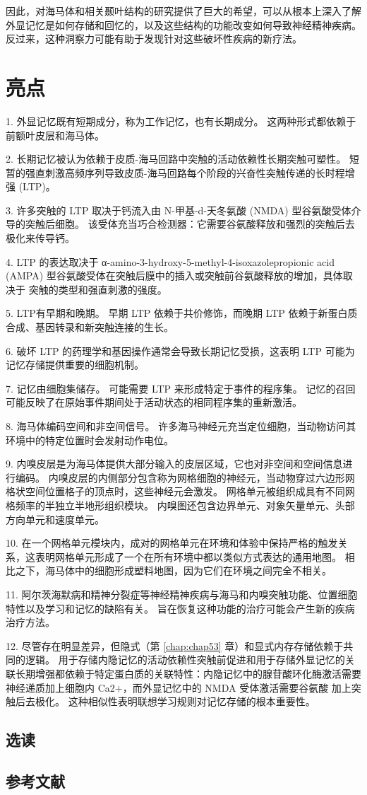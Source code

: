 因此，对海马体和相关颞叶结构的研究提供了巨大的希望，可以从根本上深入了解外显记忆是如何存储和回忆的，以及这些结构的功能改变如何导致神经精神疾病。 反过来，这种洞察力可能有助于发现针对这些破坏性疾病的新疗法。

\section{亮点}

1. 外显记忆既有短期成分，称为工作记忆，也有长期成分。 这两种形式都依赖于前额叶皮层和海马体。 

2. 长期记忆被认为依赖于皮质-海马回路中突触的活动依赖性长期突触可塑性。 短暂的强直刺激高频序列导致皮质-海马回路每个阶段的兴奋性突触传递的长时程增强 (LTP)。 

3. 许多突触的 LTP 取决于钙流入由 N-甲基-d-天冬氨酸 (NMDA) 型谷氨酸受体介导的突触后细胞。 该受体充当巧合检测器：它需要谷氨酸释放和强烈的突触后去极化来传导钙。 

4. LTP 的表达取决于 α-amino-3-hydroxy-5-methyl-4-isoxazolepropionic acid (AMPA) 型谷氨酸受体在突触后膜中的插入或突触前谷氨酸释放的增加，具体取决于 突触的类型和强直刺激的强度。 

5. LTP有早期和晚期。 早期 LTP 依赖于共价修饰，而晚期 LTP 依赖于新蛋白质合成、基因转录和新突触连接的生长。 

6. 破坏 LTP 的药理学和基因操作通常会导致长期记忆受损，这表明 LTP 可能为记忆存储提供重要的细胞机制。 

7. 记忆由细胞集储存。 可能需要 LTP 来形成特定于事件的程序集。 记忆的召回可能反映了在原始事件期间处于活动状态的相同程序集的重新激活。 

8. 海马体编码空间和非空间信号。 许多海马神经元充当定位细胞，当动物访问其环境中的特定位置时会发射动作电位。 

9. 内嗅皮层是为海马体提供大部分输入的皮层区域，它也对非空间和空间信息进行编码。 内嗅皮层的内侧部分包含称为网格细胞的神经元，当动物穿过六边形网格状空间位置格子的顶点时，这些神经元会激发。 网格单元被组织成具有不同网格频率的半独立半地形组织模块。 内嗅图还包含边界单元、对象矢量单元、头部方向单元和速度单元。 

10. 在一个网格单元模块内，成对的网格单元在环境和体验中保持严格的触发关系，这表明网格单元形成了一个在所有环境中都以类似方式表达的通用地图。 相比之下，海马体中的细胞形成塑料地图，因为它们在环境之间完全不相关。 

11. 阿尔茨海默病和精神分裂症等神经精神疾病与海马和内嗅突触功能、位置细胞特性以及学习和记忆的缺陷有关。 旨在恢复这种功能的治疗可能会产生新的疾病治疗方法。 

12. 尽管存在明显差异，但隐式（第 \ref{chap:chap53} 章）和显式内存存储依赖于共同的逻辑。 用于存储内隐记忆的活动依赖性突触前促进和用于存储外显记忆的关联长期增强都依赖于特定蛋白质的关联特性：内隐记忆中的腺苷酸环化酶激活需要神经递质加上细胞内 Ca2+，而外显记忆中的 NMDA 受体激活需要谷氨酸 加上突触后去极化。 这种相似性表明联想学习规则对记忆存储的根本重要性。


\subsection{选读}
\subsection{参考文献}


